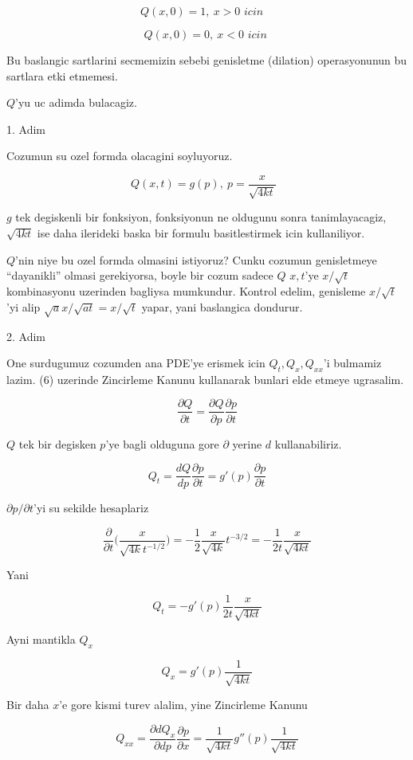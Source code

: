 \documentclass[12pt,fleqn]{article}
\begin{document}
\[ Q(x,0) = 1, \ x>0 \textit{ icin } \ \ \ \label{7}\]

\[ Q(x,0)=0, \ x<0 \textit{ icin }  \]

Bu baslangic sartlarini secmemizin sebebi genisletme (dilation)
operasyonunun bu sartlara etki etmemesi. 

$Q$'yu uc adimda bulacagiz. 

1. Adim

Cozumun su ozel formda olacagini soyluyoruz. 

\[ Q(x,t) = g(p), \ p = \frac{x}{\sqrt{4kt}} \ \ \ \label{6} \]


$g$ tek degiskenli bir fonksiyon, fonksiyonun ne oldugunu sonra
tanimlayacagiz, $\sqrt{4kt}$ ise daha ilerideki baska bir formulu
basitlestirmek icin kullaniliyor. 

$Q$'nin niye bu ozel formda olmasini istiyoruz? Cunku cozumun genisletmeye
``dayanikli'' olmasi gerekiyorsa, boyle bir cozum sadece $Q$ $x,t$'ye
$x/\sqrt{t}$ kombinasyonu uzerinden bagliysa mumkundur. Kontrol edelim,
genisleme $x/\sqrt{t}$'yi alip $\sqrt{a}x/\sqrt{at} = x/\sqrt{t}$ yapar,
yani baslangica dondurur. 

2. Adim

One surdugumuz cozumden ana PDE'ye erismek icin $Q_t,Q_{x},Q_{xx}$'i
bulmamiz lazim. (6) uzerinde Zincirleme Kanunu kullanarak bunlari elde
etmeye ugrasalim. 

\[ \frac{\partial Q}{\partial t} = 
\frac{\partial Q}{\partial p}\frac{\partial p}{\partial t}
\]

$Q$ tek bir degisken $p$'ye bagli olduguna gore $\partial$ yerine $d$
kullanabiliriz. 

\[ Q_t = 
\frac{dQ}{dp}\frac{\partial p}{\partial t}  = 
g'(p)\frac{\partial p}{\partial t} 
\]

$\partial p/\partial t$'yi su sekilde hesaplariz

\[ 
\frac{\partial }{\partial t}
\bigg( 
\frac{x}{\sqrt{4k} t ^{-1/2}}
\bigg) = 
-\frac{1}{2} \frac{x}{\sqrt{4k}} t ^{-3/2} = 
-\frac{1}{2t} \frac{x}{\sqrt{4kt}}
 \]

Yani 

\[ Q_t = 
- g'(p)\frac{1}{2t} \frac{x}{\sqrt{4kt}}
\]

Ayni mantikla $Q_x$

\[ Q_x = g'(p)\frac{1}{\sqrt{4kt}} \]

Bir daha $x$'e gore kismi turev alalim, yine Zincirleme Kanunu 

\[ Q_{xx} = \frac{\partial dQ_x}{\partial dp}
\frac{\partial p}{\partial x} = 
\frac{1}{\sqrt{4kt}}g''(p)\frac{1}{\sqrt{4kt}} 
 \]
\end{document}
